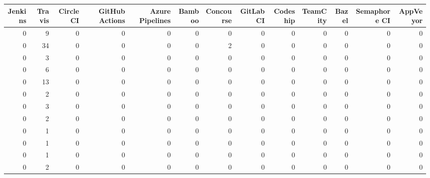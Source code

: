\begin{tabular}{rrrrrrrrrrrrr}
\toprule
 Jenkins &  Travis &  Circle CI &  GitHub Actions &  Azure Pipelines &  Bamboo &  Concourse &  GitLab CI &  Codeship &  TeamCity &  Bazel &  Semaphore CI &  AppVeyor \\
\midrule
       0 &       9 &          0 &               0 &                0 &       0 &          0 &          0 &         0 &         0 &      0 &             0 &         0 \\
       0 &      34 &          0 &               0 &                0 &       0 &          2 &          0 &         0 &         0 &      0 &             0 &         0 \\
       0 &       3 &          0 &               0 &                0 &       0 &          0 &          0 &         0 &         0 &      0 &             0 &         0 \\
       0 &       6 &          0 &               0 &                0 &       0 &          0 &          0 &         0 &         0 &      0 &             0 &         0 \\
       0 &      13 &          0 &               0 &                0 &       0 &          0 &          0 &         0 &         0 &      0 &             0 &         0 \\
       0 &       2 &          0 &               0 &                0 &       0 &          0 &          0 &         0 &         0 &      0 &             0 &         0 \\
       0 &       3 &          0 &               0 &                0 &       0 &          0 &          0 &         0 &         0 &      0 &             0 &         0 \\
       0 &       2 &          0 &               0 &                0 &       0 &          0 &          0 &         0 &         0 &      0 &             0 &         0 \\
       0 &       1 &          0 &               0 &                0 &       0 &          0 &          0 &         0 &         0 &      0 &             0 &         0 \\
       0 &       1 &          0 &               0 &                0 &       0 &          0 &          0 &         0 &         0 &      0 &             0 &         0 \\
       0 &       1 &          0 &               0 &                0 &       0 &          0 &          0 &         0 &         0 &      0 &             0 &         0 \\
       0 &       2 &          0 &               0 &                0 &       0 &          0 &          0 &         0 &         0 &      0 &             0 &         0 \\

\end{tabular}
